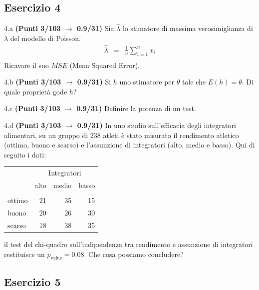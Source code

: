 \documentclass[
  11pt,
]{book}
\theoremstyle{mytheoremstyle}
\theoremstyle{mydefstyle}
\begin{document}
\subsection{Esercizio 4}\label{esercizio-4-18}

4.a \textbf{(Punti 3/103 \(\rightarrow\) 0.9/31)} Sia \(\hat \lambda\) lo stimatore di massima verosimiglianza di \(\lambda\) del modello di Poisson.
\begin{eqnarray*}
  \hat\lambda &=&  \frac 1n\sum_{i=1}^nx_i\\
\end{eqnarray*}
Ricavare il suo \(MSE\) (Mean Squared Error).

4.b \textbf{(Punti 3/103 \(\rightarrow\) 0.9/31)} Si \(h\) uno stimatore per \(\theta\) tale che \(E(h)=\theta\). Di quale proprietà gode \(h\)?

4.c \textbf{(Punti 3/103 \(\rightarrow\) 0.9/31)} Definire la potenza di un test.

4.d \textbf{(Punti 3/103 \(\rightarrow\) 0.9/31)} In uno studio sull'efficacia degli integratori alimentari, su un gruppo di 238 atleti è stato misurato il rendimento atletico (ottimo, buono e scarso) e l'assunzione di integratori (alto, medio e basso). Qui di seguito i dati:

\begin{table}[H]
\centering\centering
\begin{tabular}{lrrr}
\toprule
\multicolumn{1}{c}{ } & \multicolumn{3}{c}{Integratori} \\
\cmidrule(l{3pt}r{3pt}){2-4}
  & alto & medio & basso\\
\midrule
\addlinespace[0.3em]
\multicolumn{4}{l}{\textbf{rendimento}}\\
\hspace{1em}ottimo & 21 & 35 & 15\\
\hspace{1em}buono & 20 & 26 & 30\\
\hspace{1em}scarso & 18 & 38 & 35\\
\bottomrule
\end{tabular}
\end{table}

il test del chi-quadro sull'indipendenza tra rendimento e assunzione di integratori restituisce un \(p_\text{value}=0.08\). Che cosa possiamo concludere?

\subsection{Esercizio 5}\label{esercizio-5-17}
\end{document}
